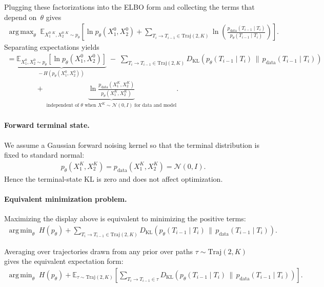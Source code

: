 \documentclass[11pt]{article}
\DeclareMathOperator*{\argmax}{arg\,max}
\DeclareMathOperator*{\argmin}{arg\,min}
\begin{document}
Plugging these factorizations into the ELBO form and collecting the terms
that depend on~$\theta$ gives
\begin{align}
\argmax_\theta\;
\mathbb{E}_{X_1^{0:K},X_2^{0:K}\sim p_\theta}
\left[
  \ln p_\theta(X_1^0,X_2^0)
  + \sum_{T_i \rightarrow T_{i-1} \in\mathrm{Traj}(2,K)}
    \ln\!\left(
      \frac{p_{\text{data}}(T_{i-1}\mid T_i)}
           {p_\theta(T_{i-1}\mid T_i)}
    \right)
\right].
\end{align}
Separating expectations yields
\begin{align}
= \underbrace{\mathbb{E}_{X_1^0,X_2^0\sim p_\theta}[\ln p_\theta(X_1^0,X_2^0)]}_{-\,H(p_\theta(X_1^0,X_2^0))}
\;-\;
\sum_{T_i \rightarrow T_{i-1} \in\mathrm{Traj}(2,K)}
D_{\mathrm{KL}}\!\left(p_\theta(T_{i-1}\mid T_i)\,\big\|\,p_{\text{data}}(T_{i-1}\mid T_i)\right)
\\
\qquad\qquad
+\; \underbrace{ \ln\frac{p_{\text{data}}(X_1^K,X_2^K)}{p_\theta(X_1^K,X_2^K)} }_{\text{independent of }\theta\text{ when }X^K\sim\mathcal N(0,I)\text{ for data and model}} .
\end{align}

\paragraph{Forward terminal state.}
We assume a Gaussian forward noising kernel so that the terminal
distribution is fixed to standard normal:
\begin{align}
p_\theta(X_1^K,X_2^K)=p_{\text{data}}(X_1^K,X_2^K)=\mathcal N(0,I).
\end{align}
Hence the terminal-state KL is zero and does not affect optimization.

\paragraph{Equivalent minimization problem.}
Maximizing the display above is equivalent to minimizing the positive
terms:
\begin{align}
\argmin_\theta\;
H\!\left(p_\theta\right)
+\sum_{T_i \rightarrow T_{i-1} \in\mathrm{Traj}(2,K)}
D_{\mathrm{KL}}\!\left(p_\theta(T_{i-1}\mid T_i)\,\big\|\,p_{\text{data}}(T_{i-1}\mid T_i)\right).
\label{eq:entropy-plus-trajectory-kls}
\end{align}

Averaging over trajectories drawn from any prior over paths
$\tau\sim\mathrm{Traj}(2,K)$ gives the equivalent expectation form:
\begin{align}
\argmin_\theta\;
H\!\left(p_\theta\right)
+
\mathbb{E}_{\tau\sim\mathrm{Traj}(2,K)}
\left[
\sum_{T_i \rightarrow T_{i-1} \in \tau}
D_{\mathrm{KL}}\!\left(
p_\theta(T_{i-1}\mid T_i)\,\big\|\,p_{\text{data}}(T_{i-1}\mid T_i)
\right)
\right].
\end{align}
\end{document}
